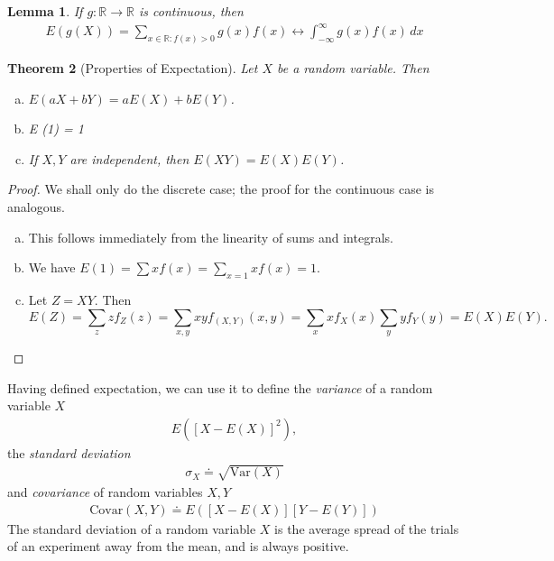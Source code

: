\documentclass[12pt]{article}
\newcommand{\rr}{\mathbb{R}}
\newcommand{\var}{\text{Var}}
\newcommand{\covar}{\text{Covar}}
\theoremstyle{plain}
\newtheorem{theorem}{Theorem}
\newtheorem{lemma}[theorem]{Lemma}
\theoremstyle{definition}
\theoremstyle{remark}
\numberwithin{equation}{section}  %
\begin{document}
\begin{lemma}
If $g: \rr \to \rr$ is continuous, then
\begin{align*}
E(g(X)) = \sum_{x \in \rr: f(x) > 0} g(x) f(x) \longleftrightarrow
\int_{-\infty}^{\infty} g(x) f(x) \, dx
\end{align*}
\end{lemma}
\begin{theorem}[Properties of Expectation]
Let $X$ be a random variable. Then
\begin{enumerate}[(a)]
	\item $E(aX + bY) = aE(X) + bE(Y)$.
	\item E (1) = 1
	\item If $X,Y$ are independent, then $E(XY) = E(X)E(Y)$.
\end{enumerate}
\end{theorem}
\begin{proof}
We shall only do the discrete case; the proof for the continuous case is
analogous.
\begin{enumerate}[(a)]
\item This follows immediately from the linearity of sums and integrals.
\item
We have $E(1) = \sum x f(x) = \sum_{x = 1} x f(x) = 1$.
\item
Let $Z = XY$. Then
\[E(Z) = \sum_{z} z f_Z(z) = \sum_{x,y} xy f_{(X,Y)}(x,y) = \sum_x x f_X(x)
\sum_y y f_Y(y) = E(X) E(Y).\]
\end{enumerate}
\end{proof}
Having defined expectation, we can use it to define the
\emph{variance} of a random variable $X$
\begin{align*}
E({[X - E(X)]}^2),
\end{align*}
the \emph{standard deviation}
\begin{align*}
\sigma_X \doteq \sqrt{\var(X)}
\end{align*}
and \emph{covariance} of random variables $X, Y$
\begin{align*}
\covar(X,Y) \doteq E([X - E(X)][Y - E(Y)])
\end{align*}
The standard deviation of a random variable $X$ is the average spread of the
trials of an experiment away from the mean, and is always positive. 
\end{document}
